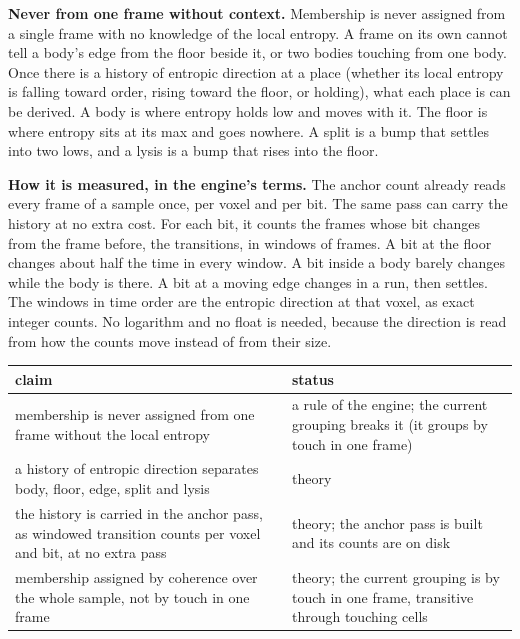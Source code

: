 \textbf{Never from one frame without context.} Membership is never assigned from a single frame with no knowledge of the local entropy. A frame on its own cannot tell a body's edge from the floor beside it, or two bodies touching from one body. Once there is a history of entropic direction at a place (whether its local entropy is falling toward order, rising toward the floor, or holding), what each place is can be derived. A body is where entropy holds low and moves with it. The floor is where entropy sits at its max and goes nowhere. A split is a bump that settles into two lows, and a lysis is a bump that rises into the floor.

\textbf{How it is measured, in the engine's terms.} The anchor count already reads every frame of a sample once, per voxel and per bit. The same pass can carry the history at no extra cost. For each bit, it counts the frames whose bit changes from the frame before, the transitions, in windows of frames. A bit at the floor changes about half the time in every window. A bit inside a body barely changes while the body is there. A bit at a moving edge changes in a run, then settles. The windows in time order are the entropic direction at that voxel, as exact integer counts. No logarithm and no float is needed, because the direction is read from how the counts move instead of from their size.

{\small
\setlength{\tabcolsep}{6pt}
\begin{longtable}{>{\RaggedRight\arraybackslash}p{}>{\RaggedRight\arraybackslash}p{}}
\toprule
claim & status \\
\midrule
\endhead
membership is never assigned from one frame without the local entropy & a rule of the engine; the current grouping breaks it (it groups by touch in one frame) \\
a history of entropic direction separates body, floor, edge, split and lysis & theory \\
the history is carried in the anchor pass, as windowed transition counts per voxel and bit, at no extra pass & theory; the anchor pass is built and its counts are on disk \\
membership assigned by coherence over the whole sample, not by touch in one frame & theory; the current grouping is by touch in one frame, transitive through touching cells \\
\bottomrule
\end{longtable}
}
